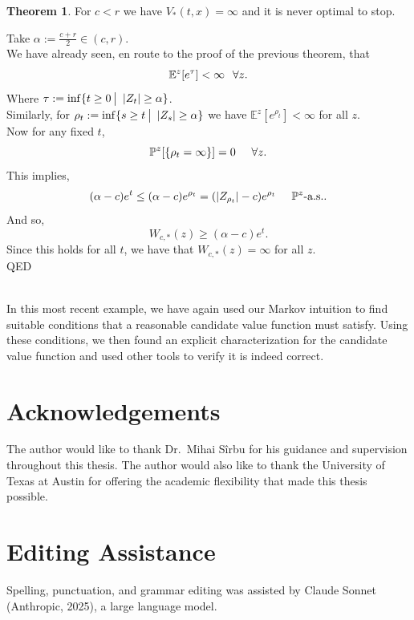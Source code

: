 \documentclass[12pt]{article}
\newcommand{\E}{\mathbb{E}}
\newcommand{\Prb}{\mathbb{P}}
\newcommand{\quantifyspace}{\hspace{2px} \big | \hspace{5px}}
\newcommand{\cheekynewline}{$\text{ }$\\}
\newcommand{\spc}{\hspace{7 px}}
\newcommand{\als}{\text{a.s.}}
\newcommand{\QED}{\hspace*{\fill}\textup{QED}}
\theoremstyle{definition}
\newtheorem{thm}{Theorem}
\begin{document}
\begin{thm}
    For $c < r$ we have $V_*(t, x) = \infty$ and it is never optimal to stop.
    \proof
 
    Take $\alpha := \frac{c + r}{2} \in (c, r)$. \\
    We have already seen, en route to the proof of the previous theorem, that
    \[
        \E^z[e^\tau] < \infty \spc \forall z.
    \]
    Where $\tau := \inf \{t \geq 0 \quantifyspace |Z_t| \geq \alpha\}$. \\
    Similarly, for $\rho_t := \inf \{s \geq t \quantifyspace |Z_s| \geq \alpha \}$ we have $\E^z [e^{\rho_t}] < \infty $ for all $z$. \\
    Now for any fixed $t$,
    \[
        \Prb^z[\{\rho_t = \infty\}] = 0 \spc \spc \forall z.
    \]
    This implies,
    \[
        (\alpha - c) e^t \leq (\alpha - c) e^{\rho_t} = (|Z_{\rho_t}| - c)e^{\rho_t} \spc \spc \Prb^z\text{-}\als.
    \]
    And so,
    \[
        W_{c, *}(z) \geq (\alpha - c) e^t.
    \]
    Since this holds for all $t$, we have that $W_{c,*}(z) = \infty$ for all $z$. \\
    \QED
\end{thm}
\cheekynewline
In this most recent example, we have again used our Markov intuition to find suitable conditions that a reasonable candidate value function must satisfy.
Using these conditions, we then found an explicit characterization for the candidate value function and used other tools to verify it is indeed correct. \\

\section*{Acknowledgements}\label{sec:ack}
The author would like to thank Dr.\ Mihai S\^{i}rbu for his guidance and supervision throughout this thesis.
The author would also like to thank the University of Texas at Austin for offering the academic flexibility that made this thesis possible.

\section*{Editing Assistance}
Spelling, punctuation, and grammar editing was assisted by Claude Sonnet (Anthropic, 2025), a large language model.
\end{document}

